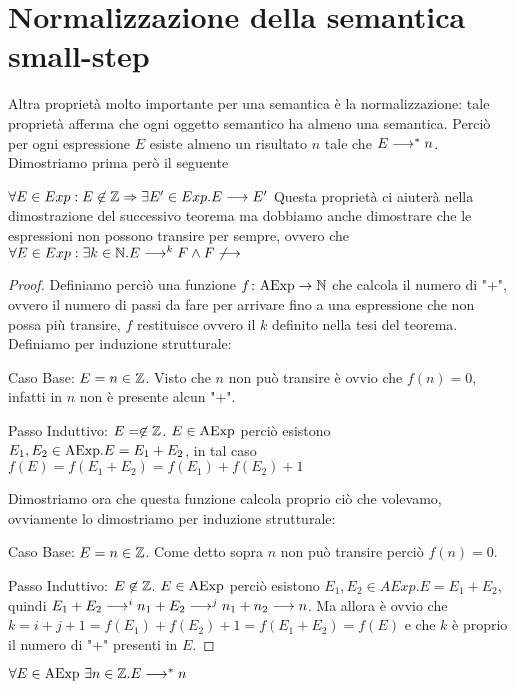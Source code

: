\section{Normalizzazione della semantica small-step}
Altra proprietà molto importante per una semantica è la normalizzazione: tale proprietà afferma che
ogni oggetto semantico ha almeno una semantica. Perciò per ogni espressione $E$
esiste almeno un risultato $n$ tale che $E \longrightarrow ^* n$.
Dimostriamo prima però il seguente

\begin{teorema}
$\forall E \in Exp \mathrel{:} E \not \in \mathbb{Z} \Rightarrow \exists E' \in Exp . E \longrightarrow E'$
Questa proprietà ci aiuterà nella dimostrazione del successivo teorema ma dobbiamo anche dimostrare che le espressioni non possono transire per sempre, ovvero che $\forall E \in Exp \mathrel{:} \exists k \in \mathbb{N} . E \longrightarrow ^k F \land F \not \longrightarrow$
\end{teorema}

\begin{proof}
Definiamo perciò una funzione $\mathord{f}\colon\mathrm{AExp}\to\mathbb{N}$ che calcola il numero di "+", ovvero il numero di passi da fare per arrivare fino a una espressione che non possa più transire, $f$ restituisce ovvero il $k$ definito nella tesi del teorema. Definiamo per induzione strutturale:

Caso Base: $E = n \in \mathbb{Z}$.
Visto che $n$ non può transire è ovvio che $f(n) = 0$, infatti in $n$ non è presente alcun "+".

Passo Induttivo: $E = \not \in \mathbb{Z}$.
$E \in \mathrm{AExp}$ perciò esistono $E_1, E_2 \in \mathrm{AExp} . E = E_1 + E_2$, in tal caso $f(E) = f(E_1 + E_2) = f(E_1) + f(E_2) + 1$

Dimostriamo ora che questa funzione calcola proprio ciò che volevamo, ovviamente lo dimostriamo per induzione strutturale:

Caso Base: $E = n \in \mathbb{Z}$.
Come detto sopra $n$ non può transire perciò $f(n) = 0$.

Passo Induttivo: $E \not \in \mathbb{Z}$.
$E \in \mathrm{AExp}$ perciò esistono $E_1, E_2 \in AExp . E = E_1 + E_2$, quindi $E_1 + E_2 \longrightarrow ^i n_1 + E_2 \longrightarrow ^j n_1 + n_2 \longrightarrow n$. Ma allora è ovvio che $k = i + j + 1 = f(E_1) + f(E_2) + 1 = f(E_1 + E_2) = f(E)$ e che $k$ è proprio il numero di "+" presenti in $E$.
\end{proof}

\begin{teorema}[Normalizzazione]
  $\forall E \in \mathrm{AExp}\ \exists n \in \mathbb{Z} . E \longrightarrow ^* n$
\end{teorema}

